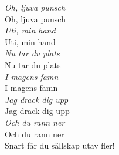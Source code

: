   \noindent\textit{Oh, ljuva punsch\\}
  Oh, ljuva punsch\\

  \noindent\textit{Uti, min hand\\}
  Uti, min hand\\

  \noindent\textit{Nu tar du plats\\}
  Nu tar du plats\\

  \noindent\textit{I magens famn\\}
  I magens famn\\

  \noindent\textit{Jag drack dig upp\\}
  Jag drack dig upp\\

  \noindent\textit{Och du rann ner\\}
  Och du rann ner\\
  
  \noindent Snart får du sällskap utav fler!
  
  \newpage